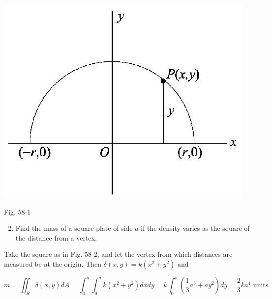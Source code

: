 \documentclass[10pt]{article}
\begin{document}
\begin{center}
\includegraphics[max width=\textwidth]{2024_04_20_fe2e8e718cc0fcd63d1bg-12}
\end{center}

Fig. 58-1

\begin{enumerate}
  \setcounter{enumi}{1}
  \item Find the mass of a square plate of side $a$ if the density varies as the square of the distance from a vertex.
\end{enumerate}

Take the square as in Fig. 58-2, and let the vertex from which distances are measured be at the origin. Then $\delta(x, y)=k\left(x^{2}+y^{2}\right)$ and

$$
m=\iint_{R} \delta(x, y) d A=\int_{0}^{a} \int_{0}^{a} k\left(x^{2}+y^{2}\right) d x d y=k \int_{0}^{a}\left(\frac{1}{3} a^{3}+a y^{2}\right) d y=\frac{2}{3} k a^{4} \text { units }
$$
\end{document}

